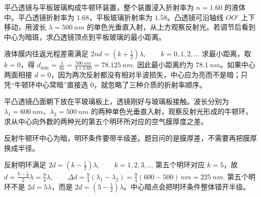 \begin{exercise}
平凸透镜与平板玻璃构成牛顿环装置，整个装置浸入折射率为 \(n=\num{1.60}\) 的液体中。平凸透镜折射率为 \(\num{1.68}\)，平板玻璃折射率为 \(\num{1.58}\)。凸透镜可沿轴线 \(OO'\) 上下移动，用波长 \(\lambda=\SI{500}{nm}\) 的单色光垂直入射，从上方观察反射光。若调节后看到中心为暗斑，求凸透镜顶点到平板玻璃的最小距离。

\begin{center}
\end{center}
\end{exercise}

\begin{solution}
液体膜内往返光程差需满足
 \(2nd=\left(k+\frac12\right)\lambda,\qquad k=0,1,2,\dots\) 
求最小距离，取 \(k=0\)，得
 \(d_{\min}=\frac{\lambda}{4n} =\frac{\SI{500}{nm}}{4\times1.60} =\SI{78.125}{nm}.\) 
因此最小距离约为 \(\SI{78.1}{nm}\)。如果中心两面相接 \(d=0\)，因为两次反射都没有相对半波损失，中心应为亮而不是暗；只凭“牛顿环中心常暗”直接选 \(0\)，就忽略了三种介质的折射率顺序。
\end{solution}


\begin{exercise}[两种波长第五个牛顿环明环对应膜厚差]
平凸透镜凸面朝下放在平玻璃板上，透镜刚好与玻璃板接触。波长分别为 \(\lambda_1=\SI{600}{nm}\)、\(\lambda_2=\SI{500}{nm}\) 的两种单色光垂直入射，观察反射光形成的牛顿环。求从中心向外数的两种光的第五个明环所对应的空气膜厚度之差。
\end{exercise}

\begin{solution}
反射牛顿环中心为暗，明环条件要带半级差。题目问的是膜厚差，不需要再把膜厚换成半径。

反射明环满足
 \(2d=\left(k-\frac12\right)\lambda,\qquad k=1,2,3,\dots\) 
第五个明环对应 \(k=5\)，故
 \(d=\frac{k-\frac12}{2}\lambda =\frac{9}{4}\lambda,\qquad \Delta d=\frac94(\lambda_1-\lambda_2) =\frac94(600-500)\,\si{nm} =\SI{225}{nm}.\) 
第五个明环不是 \(2d=5\lambda\)，而是 \(2d=(5-\frac12)\lambda\)。中心暗点会把明环条件整体错开半级。
\end{solution}

